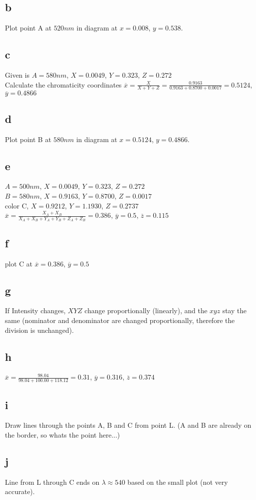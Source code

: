 \documentclass[a4paper,11pt]{article}
\newcommand{\ol}{\overline}
\begin{document}
	\subsection*{b}
		Plot point A at $520nm$ in diagram at $x=0.008$, $y=0.538$.
	\subsection*{c}
		Given is $A=580nm$, $X=0.0049$, $Y=0.323$, $Z=0.272$ \\
		Calculate the chromaticity coordinates $\ol{x}=\frac{X}{X+Y+Z}=\frac{0.9163}{0.9163+0.8700+0.0017}=0.5124$, $\ol{y}=0.4866$
	\subsection*{d}	
		Plot point B at $580nm$ in diagram at $x=0.5124$, $y=0.4866$.
	\subsection*{e}	
		$A=500nm$, $X=0.0049$, $Y=0.323$, $Z=0.272$\\
		$B=580nm$, $X=0.9163$, $Y=0.8700$, $Z=0.0017$\\ 
		color C, $X=0.9212$, $Y=1.1930$, $Z=0.2737$\\
		$\ol{x}=\frac{X_A+X_B}{X_A+X_B+Y_A+Y_B+Z_A+Z_B}=0.386$, $\ol{y}=0.5$, $\ol{z}=0.115$
	\subsection*{f}
		plot C at $\ol{x}=0.386$, $\ol{y}=0.5$
	\subsection*{g}
		If Intensity changes, $XYZ$ change proportionally (linearly), and the $xyz$ stay the same (nominator and denominator are changed proportionally, therefore the division is unchanged).
	\subsection*{h}	
		$\ol{x}=\frac{98.04}{98.04+100.00+118.12}=0.31$, $\ol{y}=0.316$, $\ol{z}=0.374$
	\subsection*{i}	
		Draw lines through the points A, B and C from point L. (A and B are already on the border, so whats the point here...)
	\subsection*{j}
		Line from L through C ends on $\lambda \approx 540$ based on the small plot (not very accurate).
\end{document}
